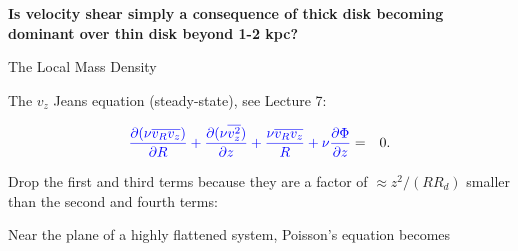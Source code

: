 \documentclass[letterpaper,landscape]{slides}
\begin{document}




 

\begin{slide}

{\bf Is velocity shear simply a consequence of thick disk 
becoming dominant over thin disk beyond 1-2 kpc?}




\vfill 
\end{slide}









\begin{slide}
\begin{center}
{\large \color{red} 
                    The Local Mass Density   }
\end{center}

The $v_z$ Jeans equation (steady-state), see Lecture 7: 

\begin{eqnarray}
\color{blue} {\partial(\nu \overline{v_R v_z}) \over \partial R } + { \partial (\nu \overline{v_z^2})
\over \partial z } + { \nu \overline{v_R v_z} \over R} + \nu { \partial\Phi \over
\partial z} & = & 0. \nonumber
\end{eqnarray}

Drop the first and third terms because they are a factor of $\approx z^2/(RR_d)$
smaller than the second and fourth terms:


Near the plane of a highly flattened system, Poisson's equation becomes



\vfill
\end{slide}
\end{document}
